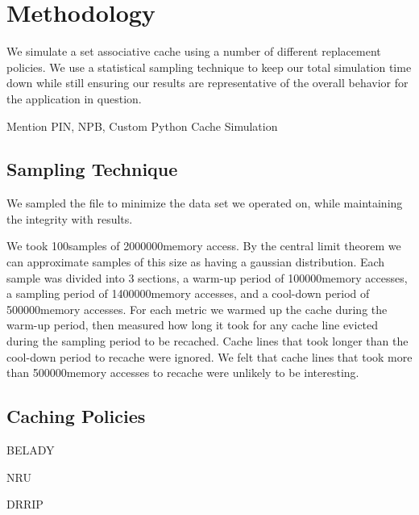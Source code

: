 \newcommand{\SAMPN}{100}
\newcommand{\SAMPK}{2000000}
\newcommand{\SAMP}{1400000}
\newcommand{\WARM}{100000}
\newcommand{\COOL}{500000}
\newcommand{\comment}[1]{}

\section{Methodology}
We simulate a set associative cache using a number of different
replacement policies.
We use a statistical sampling technique to keep our total simulation
time down while still ensuring our results are representative of the
overall behavior for the application in question.

Mention PIN, NPB, Custom Python Cache Simulation

\subsection{Sampling Technique}
We sampled the file to minimize the data set we operated on, while maintaining the integrity with results.
	\comment{Something about pin here}
	We took \SAMPN samples of \SAMPK memory access.
	By the central limit theorem we can approximate samples of this size as having a gaussian distribution.
	Each sample was divided into 3 sections, a warm-up period of \WARM memory accesses,
		a sampling period of \SAMP memory accesses, and a cool-down period of \COOL memory accesses.
	For each metric we warmed up the cache during the warm-up period,
		then measured how long it took for any cache line evicted during the sampling period to be recached.
	Cache lines that took longer than the cool-down period to recache were ignored.
	We felt that cache lines that took more than \COOL memory accesses to recache were unlikely to be interesting.

\subsection{Caching Policies}
\label{sec:policies}
BELADY

NRU

DRRIP
